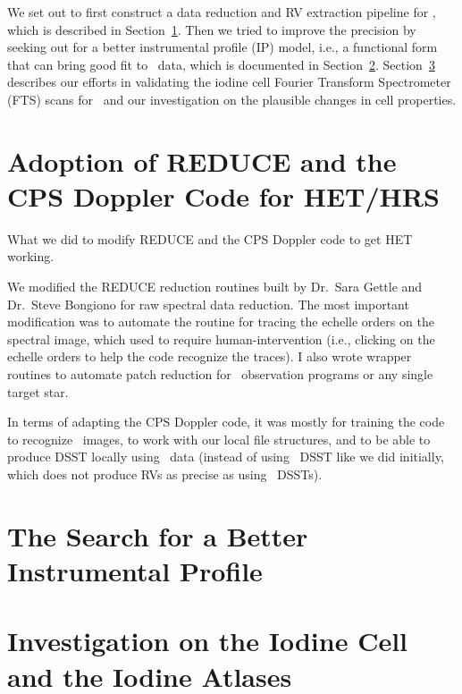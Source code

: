 We set out to first construct a data reduction and RV extraction
pipeline for \het, which is described in
Section~\ref{het:sec:pipeline}. Then we tried to improve the precision
by seeking out for a better instrumental profile (IP) model, i.e., a
functional form that can bring good fit to \het\ data, which is
documented in Section~\ref{het:sec:ip}. Section~\ref{het:sec:fts}
describes our efforts in validating the iodine cell Fourier Transform
Spectrometer (FTS) scans for \het\ and our investigation on the
plausible changes in cell properties.



\section{Adoption of REDUCE and the CPS Doppler Code for HET/HRS}\label{het:sec:pipeline}

What we did to modify REDUCE and the CPS Doppler code to get HET working.

We modified the REDUCE reduction routines built by Dr.\ Sara Gettle
and Dr.\ Steve Bongiono for raw spectral data reduction. The most
important modification was to automate the routine for tracing the
echelle orders on the spectral image, which used to require
human-intervention (i.e., clicking on the echelle orders to help the
code recognize the traces). I also wrote wrapper routines to automate
patch reduction for \het\ observation programs or any single target
star.

In terms of adapting the CPS Doppler code, it was mostly for training
the code to recognize \het\ images, to work with our local file
structures, and to be able to produce DSST locally using \het\ data
(instead of using \keck\ DSST like we did initially, which does not
produce RVs as precise as using \het\ DSSTs).



\section{The Search for a Better Instrumental Profile}\label{het:sec:ip}




\section{Investigation on the Iodine Cell and the Iodine Atlases}\label{het:sec:fts}

